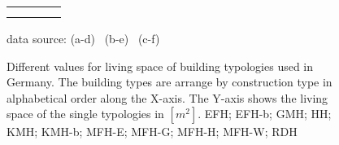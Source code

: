 \begin{figure}[htb]

  \begin{tabular}{p{0.43\linewidth} p{0.33\linewidth} p{0.43\linewidth}}
\hspace{-2.5cm}
&
\hspace{-3.8cm}
&
\hspace{-3.8cm}
\\

\hspace{-2.5cm}
&
\hspace{-3.8cm}
&
\hspace{-3.8cm}
\\
    \end{tabular}
    
\begin{flushright}
\footnotesize{data source:
(a-d)~\cite{Blesl.2007}
(b-e)~\cite{Loga.2011}
(c-f)~\cite{Born.2003}
}
\end{flushright}
	\caption[Different values for living space of building typologies used in
	Germany.]{Different values for living space of building typologies used in
	Germany.
    The building types are arrange by construction type in alphabetical order
    along the X-axis.
	The Y-axis shows the living space of the single typologies in
	$[m^2]$.
	EFH; EFH-b; GMH; HH; KMH; KMH-b; MFH-E; MFH-G; MFH-H; MFH-W; RDH}
    \label{fig:DifTypArea}
\end{figure}
